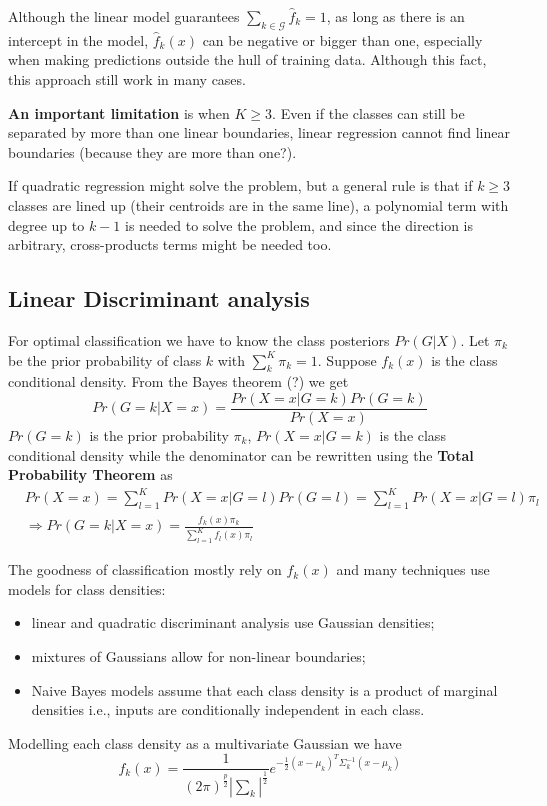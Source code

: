 \documentclass[12pt, letterpaper]{article}
\theoremstyle{definition}
\begin{document}
Although the linear model guarantees $\sum_{k \in \mathcal{G}}\hat{f}_k=1$, as long as there is an intercept in the model, $\hat{f}_k(x)$ can be negative or bigger than one, especially when making predictions outside the hull of training data. Although this fact, this approach still work in many cases.

\textbf{An important limitation} is when $K\ge 3$. Even if the classes can still be separated by more than one linear boundaries, linear regression cannot find linear boundaries (because they are more than one?).

If quadratic regression might solve the problem, but a general rule is that if $k\ge3$ classes are lined up (their centroids are in the same line), a polynomial term with degree up to $k-1$ is  needed to solve the problem, and since the direction is arbitrary, cross-products terms might be needed too.

\subsection{Linear Discriminant analysis}
For optimal classification we have to know the class posteriors $Pr\left( G|X\right)$. Let $\pi_k$ be the prior probability of class $k$ with $\sum_k^K \pi_k=1$. Suppose $f_k(x)$ is the class conditional density.
From the Bayes theorem (?) we get 
\begin{equation}
Pr\left( G=k | X=x\right) = \frac{Pr\left( X=x |G=k \right)Pr(G=k)}{Pr(X=x)}
\end{equation}
% 
$Pr(G=k)$ is the prior probability $\pi_k$, $Pr\left( X=x |G=k \right)$ is the class conditional density while the denominator can be rewritten using the \textbf{Total Probability Theorem} as
\begin{align}
&Pr(X=x) = \sum_{l=1}^{K} Pr(X=x|G=l) Pr(G=l) = \sum_{l=1}^{K} Pr(X=x|G=l) \pi_l\\
&\Rightarrow Pr\left( G=k | X=x\right) =\frac{f_k(x)\pi_k}{\sum_{l=1}^Kf_l(x)\pi_l}
\end{align}

The goodness of classification mostly rely on $f_k(x)$ and many techniques use models for class densities:
\begin{itemize}
\item linear and quadratic discriminant analysis use Gaussian densities;
\item mixtures of Gaussians allow for non-linear boundaries;
\item Naive Bayes models assume that each class density is a product of marginal densities i.e., inputs are conditionally independent in each class.
\end{itemize}
Modelling each class density as a multivariate Gaussian we have
\begin{equation}
f_k(x) = \frac{1}{(2\pi)^{\frac{p}{2}}|\sum_k|^{\frac{1}{2	}}} e^{-\frac{1}{2}\left( x-\mu_k\right)^T\Sigma_k^{-1}\left( x-\mu_k\right)}
\end{equation}
\end{document}
